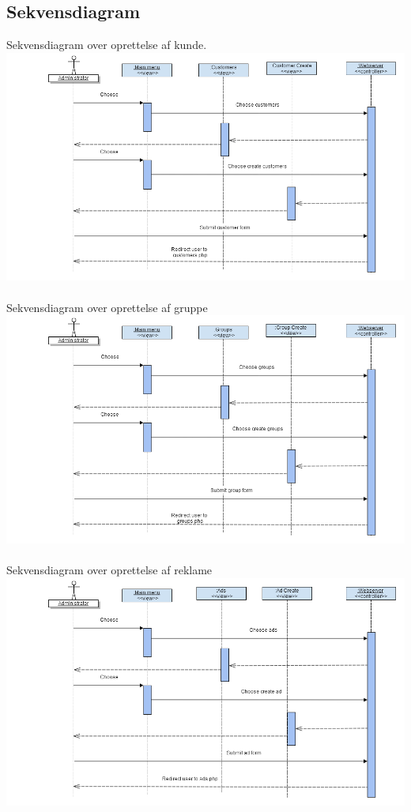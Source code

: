 \documentclass[a4paper,12pt]{article}
\begin{document}
\subsection{Sekvensdiagram}
Sekvensdiagram over oprettelse af kunde.
\\
\includegraphics[width=\textwidth]{sekvensdiagram1.png}
\\
\\
Sekvensdiagram over oprettelse af gruppe
\\
\includegraphics[width=\textwidth]{sekvensdiagram2.png}
\\
\\
Sekvensdiagram over oprettelse af reklame
\\
\includegraphics[width=\textwidth]{sekvensdiagram3.png}
\end{document}
